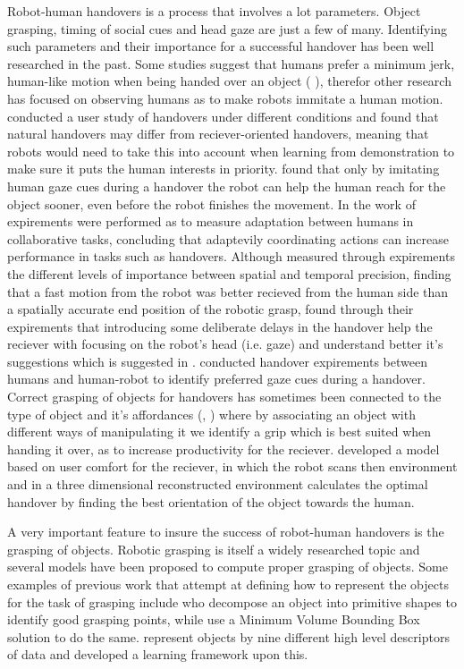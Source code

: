 Robot-human handovers is a process that involves a lot parameters. Object grasping, timing of social cues and head gaze are just a few of many. Identifying such parameters and their importance for a successful handover has been well researched in the past. Some studies suggest that humans prefer a minimum jerk, human-like motion when being handed over an object (\parencite{Huber2008} \parencite{Huber2008a}), therefor other research has focused on observing humans as to make robots immitate a human motion. \textcite{Chan2015} conducted a user study of handovers under different conditions and found that natural handovers may differ from reciever-oriented handovers, meaning that robots would need to take this into account when learning from demonstration to make sure it puts the human interests in priority. \textcite{Moon2014} found that only by imitating human gaze cues during a handover the robot can help the human reach for the object sooner, even before the robot finishes the movement. In the work of \textcite{Huang2015} expirements were performed as to measure adaptation between humans in collaborative tasks, concluding that adaptevily coordinating actions can increase performance in tasks such as handovers. Although \textcite{Koene2014} measured through expirements the different levels of importance between spatial and temporal precision, finding that a fast motion from the robot was better recieved from the human side than a spatially accurate end position of the robotic grasp, \textcite{Admoni2014} found through their expirements that introducing some deliberate delays in the handover help the reciever with focusing on the robot's head (i.e. gaze) and understand better it's suggestions which is suggested in \parencite{Moon2014}. \textcite{Gharbi2015} conducted handover expirements between humans and human-robot to identify preferred gaze cues during a handover. Correct grasping of objects for handovers has sometimes been connected to the type of object and it's affordances (\parencite{Song2015}, \parencite{Chan2014}) where by associating an object with different ways of manipulating it we identify a grip which is best suited when handing it over, as to increase productivity for the reciever. \textcite{Aleotti2012} developed a model based on user comfort for the reciever, in which the robot scans then environment and in a three dimensional reconstructed environment calculates the optimal handover by finding the best orientation of the object towards the human.

A very important feature to insure the success of robot-human handovers is the grasping of objects. Robotic grasping is itself a widely researched topic and several models have been proposed to compute proper grasping of objects. Some examples of previous work that attempt at defining how to represent the objects for the task of grasping include \textcite{Miller2003} who decompose an object into primitive shapes to identify good grasping points, while \textcite{Huebner2008} use a Minimum Volume Bounding Box solution to do the same. \textcite{Morales} represent objects by nine different high level descriptors of data and developed a learning framework upon this.

